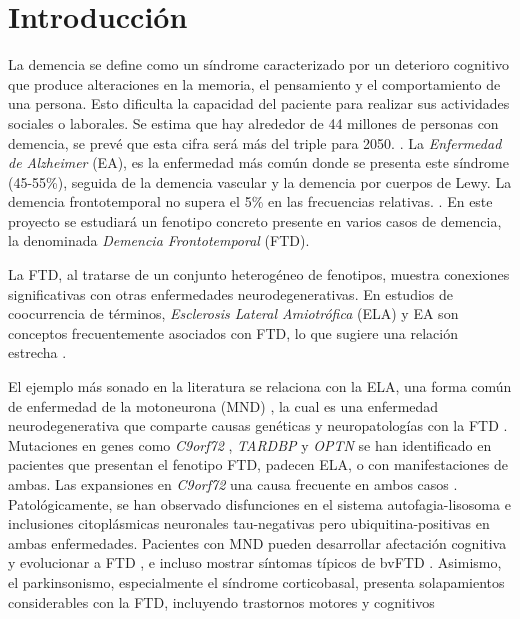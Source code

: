 \section{Introducción}

La demencia se define como un síndrome caracterizado por un deterioro cognitivo que produce alteraciones en la memoria, el pensamiento y el comportamiento de una persona. Esto dificulta la capacidad del paciente para realizar sus actividades sociales o laborales. \cite{Formiga2009} Se estima que hay alrededor de 44 millones de personas con demencia, se prevé que esta cifra será más del triple para 2050. \cite{Long2023}.
La \textit{Enfermedad de Alzheimer} (EA), es la enfermedad más común donde se presenta este síndrome (45-55\%), seguida de la demencia vascular y la demencia por cuerpos de Lewy. La demencia frontotemporal no supera el 5\% en las frecuencias relativas. \cite{ GOODMAN201728, GarreOlmo2016}. En este proyecto se estudiará un fenotipo concreto presente en varios casos de demencia, la denominada \textit{Demencia Frontotemporal} (FTD).


La FTD, al tratarse de un conjunto heterogéneo de fenotipos, muestra conexiones significativas con otras enfermedades neurodegenerativas. En estudios de coocurrencia de términos, \textit{Esclerosis Lateral Amiotrófica} (ELA) y EA son conceptos frecuentemente asociados con FTD, lo que sugiere una relación estrecha \cite{fneur.2024.1399600}. %

El ejemplo más sonado en la literatura se relaciona con la ELA, una forma común de enfermedad de la motoneurona (MND) \cite{NHS_MND}, la cual es una enfermedad neurodegenerativa que comparte causas genéticas y neuropatologías con la FTD \cite{10.1093/brain/awr195}. Mutaciones en genes como \textit{C9orf72} \cite{DeJesusHernandez2011}, \textit{TARDBP} \cite{Arai2006} y \textit{OPTN} \cite{Bussi2018} se han identificado en pacientes que presentan el fenotipo FTD, padecen ELA, o con manifestaciones de ambas.  Las expansiones en \textit{C9orf72} una causa frecuente en ambos casos \cite{Balendra2018, DeJesusHernandez2011}. Patológicamente, se han observado disfunciones en el sistema autofagia-lisosoma \cite{Casterton2020} e inclusiones citoplásmicas neuronales tau-negativas pero ubiquitina-positivas \cite{Arai2006} en ambas enfermedades. Pacientes con MND pueden desarrollar afectación cognitiva y evolucionar a FTD \cite{Devenney2015}, e incluso mostrar síntomas típicos de bvFTD \cite{Devenney2019}. Asimismo, el parkinsonismo, especialmente el síndrome corticobasal, presenta solapamientos considerables con la FTD, incluyendo trastornos motores y cognitivos \cite{Orphanet_MND}


